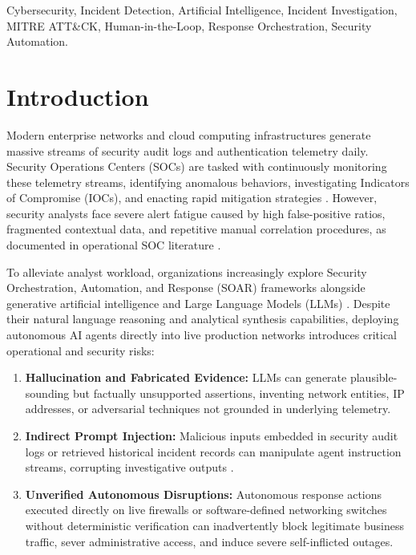 \documentclass[conference]{IEEEtran}
\begin{document}
\begin{IEEEkeywords}
Cybersecurity, Incident Detection, Artificial Intelligence, Incident Investigation, MITRE ATT\&CK, Human-in-the-Loop, Response Orchestration, Security Automation.
\end{IEEEkeywords}

\section{Introduction}
Modern enterprise networks and cloud computing infrastructures generate massive streams of security audit logs and authentication telemetry daily. Security Operations Centers (SOCs) are tasked with continuously monitoring these telemetry streams, identifying anomalous behaviors, investigating Indicators of Compromise (IOCs), and enacting rapid mitigation strategies \cite{nelson2025incident}. However, security analysts face severe alert fatigue caused by high false-positive ratios, fragmented contextual data, and repetitive manual correlation procedures, as documented in operational SOC literature \cite{chhetri2024towards}.

To alleviate analyst workload, organizations increasingly explore Security Orchestration, Automation, and Response (SOAR) frameworks alongside generative artificial intelligence and Large Language Models (LLMs) \cite{islam2019multivocal}. Despite their natural language reasoning and analytical synthesis capabilities, deploying autonomous AI agents directly into live production networks introduces critical operational and security risks:
\begin{enumerate}
    \item \textbf{Hallucination and Fabricated Evidence:} LLMs can generate plausible-sounding but factually unsupported assertions, inventing network entities, IP addresses, or adversarial techniques not grounded in underlying telemetry.
    \item \textbf{Indirect Prompt Injection:} Malicious inputs embedded in security audit logs or retrieved historical incident records can manipulate agent instruction streams, corrupting investigative outputs \cite{greshake2023not}.
    \item \textbf{Unverified Autonomous Disruptions:} Autonomous response actions executed directly on live firewalls or software-defined networking switches without deterministic verification can inadvertently block legitimate business traffic, sever administrative access, and induce severe self-inflicted outages.
\end{enumerate}
\end{document}
